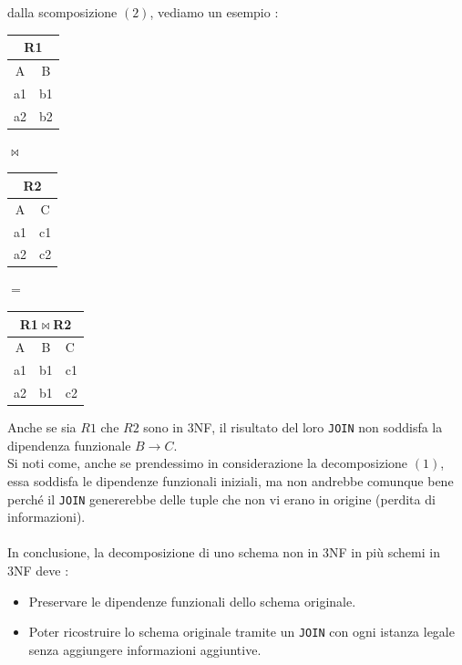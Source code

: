 \documentclass[12pt, letterpaper]{article}
\newcommand{\code}[1]{\colorbox{light-gray}{\texttt{#1}}}
\begin{document}
dalla scomposizione \((2)\), vediamo un esempio :\begin{center}
    \begin{tabular}{|c|c|}
        \hline
        \multicolumn{2}{|c|}{R1}  \\\hline
        A  & B  \\ \hline
        a1 & b1 \\ \hline
        a2 & b2 \\ \hline
        \end{tabular}\(\Join\)
        \begin{tabular}{|c|c|}
            \hline
            \multicolumn{2}{|c|}{R2}  \\\hline
            A  & C  \\ \hline
            a1 & c1 \\ \hline
            a2 & c2 \\ \hline
            \end{tabular}
            \(=\)
            \begin{tabular}{|c|c|l|}
                \hline
                \multicolumn{3}{|c|}{R1\(\Join\)R2}  \\\hline
                A  & B  & C  \\ \hline
                a1 & b1 & c1 \\ \hline
                a2 & b1 & c2 \\ \hline
                \end{tabular}
\end{center}
Anche se sia \(R1\) che \(R2\) sono in 3NF, il risultato del loro \code{JOIN} non soddisfa la dipendenza funzionale \(B\rightarrow C\). 
\\Si noti come, anche se prendessimo in considerazione la decomposizione \((1)\), essa soddisfa le dipendenze funzionali 
iniziali, ma non andrebbe comunque bene perché il \code{JOIN} genererebbe delle tuple che non vi erano in origine (perdita di 
informazioni).\\\hphantom{}\\ In conclusione, la decomposizione di uno schema non in 3NF in più schemi in 3NF deve : \begin{itemize}
    \item Preservare le dipendenze funzionali dello schema originale. 
    \item Poter ricostruire lo schema originale tramite un \code{JOIN} con ogni istanza legale senza aggiungere 
    informazioni aggiuntive.
\end{itemize}
\end{document}
